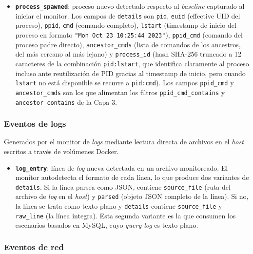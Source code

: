 \begin{itemize}
    \item \textbf{\texttt{process\_spawned}}: proceso nuevo detectado respecto
    al \textit{baseline} capturado al iniciar el monitor. Los campos de
    \texttt{details} son \texttt{pid}, \texttt{euid} (effective UID del
    proceso), \texttt{ppid}, \texttt{cmd} (comando completo), \texttt{lstart}
    (timestamp de inicio del proceso en formato \texttt{"Mon Oct 23 10:25:44
    2023"}), \texttt{ppid\_cmd} (comando del proceso padre directo),
    \texttt{ancestor\_cmds} (lista de comandos de los ancestros, del más cercano
    al más lejano) y \texttt{process\_id} (hash SHA-256 truncado a 12 caracteres
    de la combinación \texttt{pid:lstart}, que identifica claramente al proceso
    incluso ante reutilización de PID gracias al timestamp de inicio, pero
    cuando \texttt{lstart} no está disponible se recurre a \texttt{pid:cmd}).
    Los campos \texttt{ppid\_cmd} y \texttt{ancestor\_cmds} son los que
    alimentan los filtros \texttt{ppid\_cmd\_contains} y
    \texttt{ancestor\_contains} de la Capa 3.
\end{itemize}

\subsubsection*{Eventos de logs}

Generados por el monitor de \textit{logs} mediante lectura directa de archivos
en el \textit{host} escritos a través de volúmenes Docker.
\begin{sloppypar}
    \begin{itemize}
        \item \textbf{\texttt{log\_entry}}: línea de \textit{log} nueva
        detectada en un archivo monitoreado. El monitor autodetecta el formato
        de cada línea, lo que produce dos variantes de \texttt{details}. Si la
        línea parsea como JSON, contiene \texttt{source\_file} (ruta del archivo
        de \textit{log} en el \textit{host}) y \texttt{parsed} (objeto JSON
        completo de la línea). Si no, la
        línea se trata como texto plano y \texttt{details} contiene
        \texttt{source\_file} y \texttt{raw\_line} (la línea íntegra). Esta
        segunda variante es la que consumen los escenarios basados en MySQL,
        cuyo \textit{query log} es texto plano.
    \end{itemize}
\end{sloppypar}

\subsubsection*{Eventos de red}

